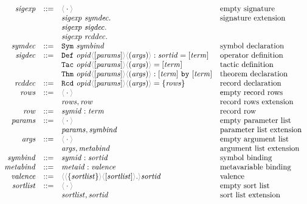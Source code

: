 \begin{figure}
  \begin{displaymath}
    \begin{array}{rcll}
       \SortSigExpr & ::=
         & \ProdEmptySig & \text{empty signature}\\
         && \ProdExtendSig{\SortSigExpr}{\SortSymDecl} & \text{signature extension}\\
         && \ProdExtendSig{\SortSigExpr}{\SortSigDecl} \\
         && \ProdExtendSig{\SortSigExpr}{\SortRcdDecl} \\
       \SortSymDecl & ::=
         & \ProdSymDecl{\SortSymBind} & \text{symbol declaration}\\
       \SortSigDecl & ::=
         & \ProdDefDecl{\SortOpId}{\SortParams}{\SortArgs}{\SortSortId}{\SortTerm} & \text{operator definition}\\
         && \ProdTacDecl{\SortOpId}{\SortParams}{\SortArgs}{\SortTerm} & \text{tactic definition}\\
         && \ProdThmDecl{\SortOpId}{\SortParams}{\SortArgs}{\SortTerm}{\SortTerm} & \text{theorem declaration}\\
       \SortRcdDecl & ::=
         & \ProdRcdDecl{\SortOpId}{\SortParams}{\SortArgs}{\SortRcdRows} & \text{record declaration}\\
       \SortRcdRows & ::=
         & \ProdEmptyCtx & \text{empty record rows}\\
         && \ProdExtendCtx{\SortRcdRows}{\SortRowDecl} & \text{record rows extension}\\
       \SortRowDecl & ::=
         & \ProdBind{\SortSymId}{\SortTerm} & \text{record row}\\
       \SortParams & ::=
         & \ProdEmptyCtx & \text{empty parameter list}\\
         && \ProdExtendCtx{\SortParams}{\SortSymBind} & \text{parameter list extension}\\
       \SortArgs & ::=
         & \ProdEmptyCtx & \text{empty argument list}\\
         && \ProdExtendCtx{\SortArgs}{\SortMetaBind}  & \text{argument list extension}\\
       \SortSymBind & ::=
         & \ProdBind{\SortSymId}{\SortSortId} & \text{symbol binding}\\
       \SortMetaBind & ::=
         & \ProdBind{\SortMetaId}{\SortValence} & \text{metavariable binding}\\
       \SortValence & ::=
         & \ProdValence{\SortSortList}{\SortSortList}{\SortSortId} & \text{valence}\\
       \SortSortList & ::=
         & \ProdEmptyCtx & \text{empty sort list}\\
         && \ProdExtendCtx{\SortSortList}{\SortSortId} & \text{sort list extension}
     \end{array}
  \end{displaymath}


\end{figure}
